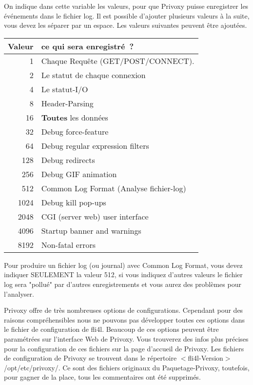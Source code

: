 \begin{description}

        {On indique dans cette variable les valeurs, pour que Privoxy puisse
        enregistrer les événements dans le fichier log. Il est possible d'ajouter
        plusieurs valeurs à la suite, vous devez les séparer par un espace. Les
        valeurs suivantes peuvent être ajoutées.

        \begin{tabular}[h!]{rl}

    Valeur & ce qui sera enregistré~? \\
    \hline
    1    & Chaque Requête (GET/POST/CONNECT). \\
    2    & Le statut de chaque connexion \\
    4    & Le statut-I/O \\
    8    & Header-Parsing \\
    16   & \textbf{Toutes} les données \\
    32   & Debug force-feature \\
    64   & Debug regular expression filters \\
    128  & Debug redirects \\
    256  & Debug GIF animation \\
    512  & Common Log Format (Analyse fichier-log) \\
    1024 & Debug kill pop-ups \\
    2048 & CGI (server web) user interface \\
    4096 & Startup banner and warnings \\
    8192 & Non-fatal errors \\
        \end{tabular}

        Pour produire un fichier log (ou journal) avec Common Log Format, vous
        devez indiquer SEULEMENT la valeur 512, si vous indiquez d'autres
        valeurs le fichier log sera "pollué" par d'autres enregistrements
        et vous aurez des problèmes pour l'analyser.}
\end{description}

        Privoxy offre de très nombreuses options de configurations. Cependant
        pour des raisons compréhensibles nous ne pouvons pas développer toutes
        ces options dans le fichier de configuration de fli4l. Beaucoup de ces
        options peuvent être paramétrées sur l'interface Web de Privoxy. Vous
        trouverez des infos plus précises pour la configuration de ces fichiers
        sur la page d'accueil de Privoxy. Les fichiers de configuration de
        Privoxy se trouvent dans le répertoire $<$fli4l-Version$>$/opt/etc/privoxy/.
        Ce sont des fichiers originaux du Paquetage-Privoxy, toutefois, pour
        gagner de la place, tous les commentaires ont été supprimés.
